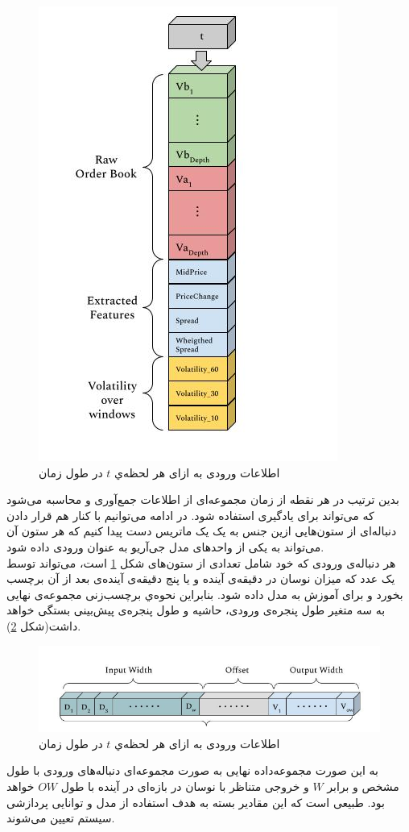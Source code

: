\begin{figure}[!t]
	\includegraphics[width=0.5 \textwidth]{images/dataset_1}
	\centering
	\caption{اطلاعات ورودی به ازای هر لحظه‌ي $t$ در طول زمان	}
	\label{fig.dataset_1}
\end{figure}
بدین ترتیب در هر نقطه‌ از زمان مجموعه‌ای از اطلاعات جمع‌آوری و محاسبه می‌شود که می‌تواند برای یادگیری استفاده شود. در ادامه می‌توانیم با کنار هم قرار دادن دنباله‌ای از ستون‌هایی ازین جنس به یک یک ماتریس دست پیدا کنیم که هر ستون آن می‌تواند به یکی از واحد‌های مدل‌ جی‌آریو به عنوان ورودی داده شود.\\
هر دنباله‌ی ورودی که خود شامل تعدادی از ستون‌های شکل \ref{fig.dataset_1} است، می‌تواند توسط یک عدد که میزان نوسان در دقیقه‌ی آینده و یا پنج دقیقه‌ی آینده‌ی بعد از آن برچسب بخورد و برای آموزش به مدل داده شود. بنابراین نحوه‌ي برچسب‌زنی مجموعه‌ی نهایی به سه متغیر طول پنجره‌ی ورودی، حاشیه و طول پنجره‌ی پیش‌بینی بستگی خواهد داشت(شکل \ref{fig.input_gru}).
\newpage
\begin{figure}[!t]
	\includegraphics[width=1 \textwidth]{images/input_gru}
	\centering
	\caption{اطلاعات ورودی به ازای هر لحظه‌ي $t$ در طول زمان	}
	\label{fig.input_gru}
\end{figure}
به این صورت مجموعه‌داده نهایی به صورت مجموعه‌ای دنباله‌های ورودی با طول مشخص و برابر $W$ و خروجی متناظر با نوسان در بازه‌ای در آینده با طول $OW$ خواهد بود. طبیعی است که این مقادیر بسته به هدف استفاده از‌ مدل و توانایی پردازشی سیستم تعیین می‌شوند.
